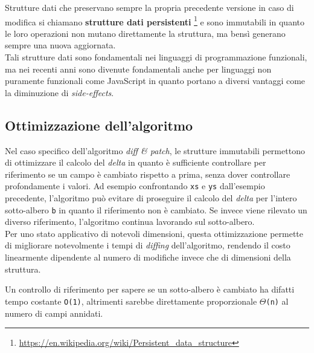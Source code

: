 Strutture dati che preservano sempre la propria precedente versione in caso di modifica si chiamano \textbf{strutture dati persistenti} \footnote{\url{https://en.wikipedia.org/wiki/Persistent_data_structure}} e sono immutabili in quanto le loro operazioni non mutano direttamente la struttura, ma bensì generano sempre una nuova aggiornata. \\

Tali strutture dati sono fondamentali nei linguaggi di programmazione funzionali, ma nei recenti anni sono divenute fondamentali anche per linguaggi non puramente funzionali come JavaScript in quanto portano a diversi vantaggi come la diminuzione di \textit{side-effects}.

\subsection{Ottimizzazione dell'algoritmo}

Nel caso specifico dell'algoritmo \textit{diff \& patch}, le strutture immutabili permettono di ottimizzare il calcolo del \textit{delta} in quanto è sufficiente controllare per riferimento se un campo è cambiato rispetto a prima, senza dover controllare profondamente i valori. Ad esempio confrontando \texttt{xs} e \texttt{ys} dall'esempio precedente, l'algoritmo può evitare di proseguire il calcolo del \textit{delta} per l'intero sotto-albero \texttt{b} in quanto il riferimento non è cambiato. Se invece viene rilevato un diverso riferimento, l'algoritmo continua lavorando sul sotto-albero. \\

Per uno stato applicativo di notevoli dimensioni, questa ottimizzazione permette di migliorare notevolmente i tempi di \textit{diffing} dell'algoritmo, rendendo il costo linearmente dipendente al numero di modifiche invece che di dimensioni della struttura.

Un controllo di riferimento per sapere se un sotto-albero è cambiato ha difatti tempo costante \texttt{O(1)}, altrimenti sarebbe direttamente proporzionale \texttt{$\Theta$(n)} al numero di campi annidati.

